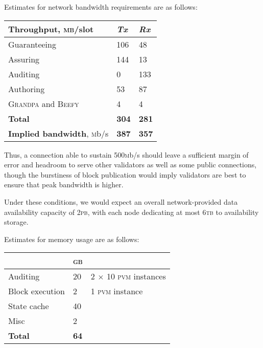Estimates for network bandwidth requirements are as follows:
\begin{center}
\begin{tabular}[h]{@{}lll@{}}
  \toprule
  Throughput, \textsc{mb}/slot & \emph{Tx} & \emph{Rx} \\
  \midrule
  Guaranteeing & 106 & 48 \\
  Assuring & 144 & 13 \\
  Auditing & 0 & 133 \\
  Authoring & 53 & 87 \\
  \textsc{Grandpa} and \textsc{Beefy} & 4 & 4 \\
  \textbf{Total} & \textbf{304} & \textbf{281} \\
  \midrule
  \textbf{Implied bandwidth}, \textsc{m}b/s & \textbf{387} & \textbf{357} \\
  \bottomrule
\end{tabular}
\end{center}

Thus, a connection able to sustain 500\textsc{m}b/s should leave a sufficient margin of error and headroom to serve other validators as well as some public connections, though the burstiness of block publication would imply validators are best to ensure that peak bandwidth is higher.

Under these conditions, we would expect an overall network-provided data availability capacity of 2\textsc{pb}, with each node dedicating at most $6$\textsc{tb} to availability storage.

Estimates for memory usage are as follows:

\begin{center}
  \begin{tabular}[h]{@{}lll@{}}
    \toprule
    & \textsc{gb} \\
    \midrule
    Auditing & 20 & 2 $\times$ 10 \textsc{pvm} instances \\
    Block execution & 2 & 1 \textsc{pvm} instance \\
    State cache & 40 & \\
    Misc & 2 & \\
    \textbf{Total} & \textbf{64} & \\
    \bottomrule
  \end{tabular}
\end{center}

